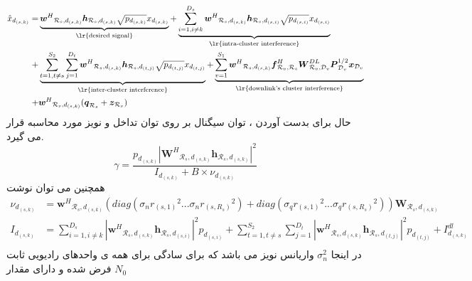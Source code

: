 \begin{equation}
\begin{split}
\hat{x}_{d_{(s,k)}} = &  \underbrace{ {\boldsymbol{w}^H}_{\mathcal{R}_s, d_{(s,k)}} \boldsymbol{h}_{\mathcal{R}_s, d_{(s,k)}} \sqrt{p_{d_{(s,k)}}}  x_{d_{(s,k)}}}_{\text{\lr{desired signal}}} 
+  \underbrace{ \sum_{i=1,i\neq k}^{D_s}  {\boldsymbol{w}^H}_{\mathcal{R}_s, d_{(s,k)}} \boldsymbol{h}_{\mathcal{R}_s, d_{(s,i)}} \sqrt{p_{d_{(s,i)}}}  x_{d_{(s,i)}}}_{\text{\lr{intra-cluster interference}}} \\
+&   \underbrace{ \sum_{t=1,t\neq s}^{S_2} \sum_{j=1}^{D_t} {\boldsymbol{w}^H}_{\mathcal{R}_s, d_{(s,k)}} \boldsymbol{h}_{\mathcal{R}_s, d_{(t,j)}} \sqrt{p_{d_{(t,j)}}}  x_{d_{(t,j)}}}_{\text{\lr{inter-cluster interference}}} 
+ \underbrace{\sum_{v=1}^{S_1} {\boldsymbol{w}^H}_{\mathcal{R}_s, d_{(s,k)}}    \boldsymbol{f}_{\mathcal{R}_v, \mathcal{R}_s}^H  \boldsymbol{W}_{\mathcal{R}_v,\mathcal{D}_v}^{DL} \boldsymbol{P}_{\mathcal{D}_v}^{1/2}  \boldsymbol{x}_{\mathcal{D}_v}}_{\text{\lr{downlink's cluster interference}}}\\
+& {\boldsymbol{w}^H}_{\mathcal{R}_s, d_{(s,k)}}  ({\boldsymbol{q}}_{\mathcal{R}_s} + {\boldsymbol{z}}_{\mathcal{R}_s})
\end{split}
\end{equation}
حال برای بدست آوردن ، توان سیگنال بر روی توان تداخل و نویز مورد محاسبه قرار می گیرد.
\begin{equation}
\gamma = \frac{p_{d_{(s,k)}}|{\boldsymbol{W}^H}_{\mathcal{R}_s, d_{(s,k)}} \boldsymbol{h}_{\mathcal{R}_s, d_{(s,k)}}|^2}{
  I_{d_{(s,k)}}
+ B \times \nu_{d_{(s,k)}}
}
\end{equation}
همچنین می توان نوشت
\begin{equation}
\begin{split}
\nu_{d_{(s,k)}}&  = {\boldsymbol{w}^H}_{\mathcal{R}_s, d_{(s,k)}}  (diag(\sigma_n{r_{(s,1)}}^2...\sigma_n{r_{(s,R_s)}}^2)+diag(\sigma_q{r_{(s,1)}}^2...\sigma_q{r_{(s,R_s)}}^2)) {\boldsymbol{W}}_{\mathcal{R}_s, d_{(s,k)}}\\
I_{d_{(s,k)}}& = \sum_{i=1,i\neq k}^{D_s}  |{\boldsymbol{w}^H}_{\mathcal{R}_s, d_{(s,k)}} \boldsymbol{h}_{\mathcal{R}_s, d_{(s,i)}}|^2 p_{d_{(s,i)}} +\sum_{t=1,t\neq s}^{S_2} \sum_{j=1}^{D_t} |{\boldsymbol{w}^H}_{\mathcal{R}_s, d_{(s,k)}} \boldsymbol{h}_{\mathcal{R}_s, d_{(t,j)}}|^2 p_{d_{(t,j)}}+I_{d_{(s,k)}}^{dl} \\
\end{split}
\end{equation}
 در اینجا  $\sigma_n^2$ واریانس نویز می باشد که برای سادگی برای همه ی واحدهای رادیویی ثابت فرض شده و دارای مقدار $N_0$ 
